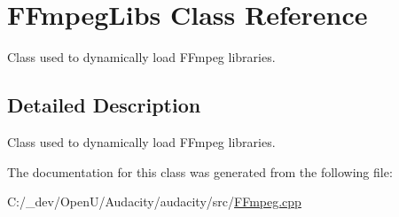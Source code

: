 \hypertarget{class_f_fmpeg_libs}{}\section{F\+Fmpeg\+Libs Class Reference}
\label{class_f_fmpeg_libs}


Class used to dynamically load F\+Fmpeg libraries.  




\subsection{Detailed Description}
Class used to dynamically load F\+Fmpeg libraries. 

The documentation for this class was generated from the following file\+:\begin{DoxyCompactItemize}
\item 
C\+:/\+\_\+dev/\+Open\+U/\+Audacity/audacity/src/\hyperlink{_f_fmpeg_8cpp}{F\+Fmpeg.\+cpp}\end{DoxyCompactItemize}
